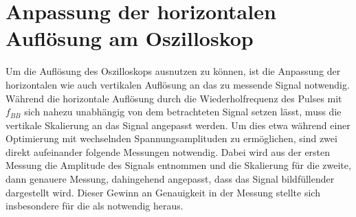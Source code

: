 \documentclass[../Report.tex]{subfiles}
\begin{document}
\section{Anpassung der horizontalen Auflösung am Oszilloskop}

Um die Auflösung des Oszilloskops ausnutzen zu können, ist die Anpassung der horizontalen wie auch vertikalen Auflösung an das zu messende Signal notwendig.
Während die horizontale Auflösung durch die Wiederholfrequenz des Pulses mit $f_{BB}$ sich nahezu unabhängig von dem betrachteten Signal setzen lässt, muss die vertikale Skalierung an das Signal angepasst werden. Um dies etwa während einer Optimierung mit wechselnden Spannungsamplituden zu ermöglichen, sind zwei direkt aufeinander folgende Messungen notwendig. Dabei wird aus der ersten Messung die Amplitude des Signals entnommen und die Skalierung für die zweite, dann genauere Messung, dahingehend angepasst, dass das Signal bildfüllender dargestellt wird.
Dieser Gewinn an Genauigkeit in der Messung stellte sich insbesondere für die  als notwendig heraus.
\end{document}
